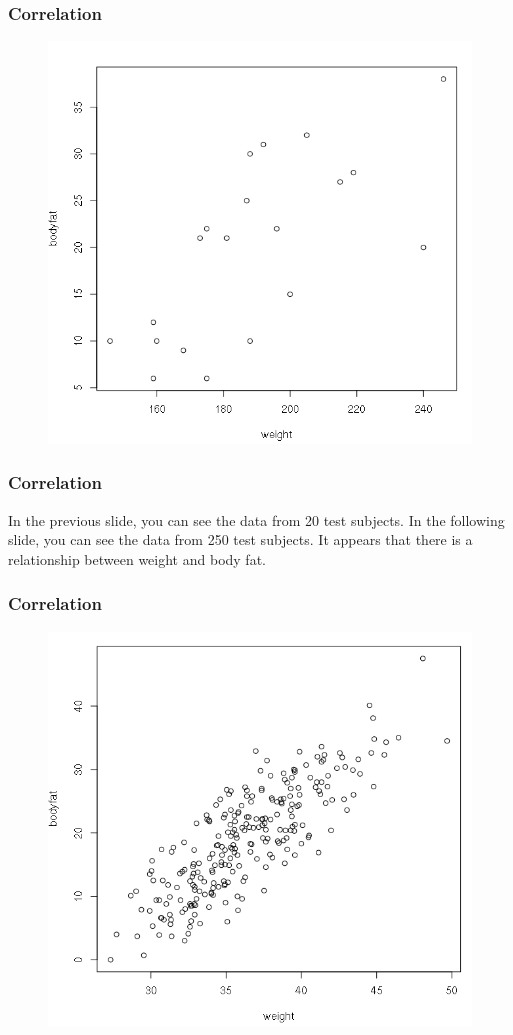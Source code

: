 \documentclass[xcolor=dvipsnames]{beamer}
\begin{document}
\begin{frame}
  \frametitle{Correlation}
\begin{figure}[h]
\includegraphics[scale=.35]{./diagrams/bf-01.png}
\end{figure}
\end{frame}

\begin{frame}
  \frametitle{Correlation}
  In the previous slide, you can see the data from 20 test subjects.
  In the following slide, you can see the data from 250 test subjects. It appears that there is a
  relationship between weight and body fat.
\end{frame}

\begin{frame}
  \frametitle{Correlation}
\begin{figure}[h]
\includegraphics[scale=.35]{./diagrams/bf-02.png}
\end{figure}
\end{frame}
\end{document}
